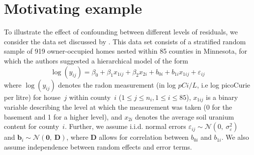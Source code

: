 \documentclass[12pt]{article} %
\newcommand{\al}[1]{{\color{red} #1}}
\begin{document}
\section{Motivating example}\label{sec:ex}
To illustrate the effect of confounding between different levels of residuals, we consider the data set discussed by
 \cite{Gelman:2006ue}. This data set consists of a stratified random sample of 919 owner-occupied homes nested within 85 counties in Minnesota, for which the authors suggested a hierarchical model of the form
%
\begin{equation}\label{eq:radon}
  \log(y_{ij}) = \beta_0 + \beta_1 x_{1ij} + \beta_2 x_{2i} + b_{0i} + b_{1i} x_{1ij}  + \varepsilon_{ij}
\end{equation}
%
where   $\log(y_{ij})$ denotes the  radon measurement (in log $pCi/L$, i.e log picoCurie per litre) for house~$j$ within county~$i$ ($1 \le j \le n_i, 1 \le i \le 85$),
 $x_{1ij}$ is a binary variable describing the level at which the measurement was taken (0 for the basement and 1 for a higher level), and $x_{2i}$ denotes the average soil uranium content for  county~$i$. 
 Further, we assume i.i.d. normal errors $\varepsilon_{ij} \sim \mathcal{N} (0,\ \sigma^2_{\varepsilon})$  and $\bm{b}_i \sim \mathcal{N}(\bm{0},\ \bm{D})$, where $\bm{D}$ allows for correlation between $b_{0i}$ and $b_{1i}$. We also assume independence between random effects and error \al{terms}. 
\end{document}
